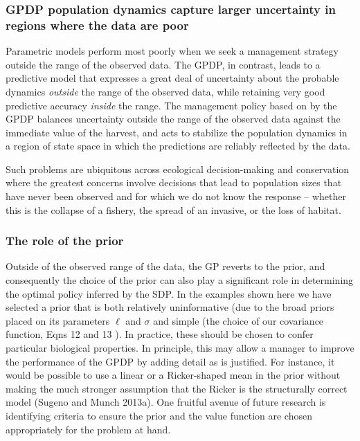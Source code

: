 \documentclass[author-year, 12pt,review]{components/elsarticle} %
\begin{document}
\subsubsection{GPDP population dynamics capture larger uncertainty in
regions where the data are
poor}\label{gpdp-population-dynamics-capture-larger-uncertainty-in-regions-where-the-data-are-poor}

Parametric models perform most poorly when we seek a management strategy
outside the range of the observed data. The GPDP, in contrast, leads to
a predictive model that expresses a great deal of uncertainty about the
probable dynamics \emph{outside} the range of the observed data, while
retaining very good predictive accuracy \emph{inside} the range. The
management policy based on by the GPDP balances uncertainty outside the
range of the observed data against the immediate value of the harvest,
and acts to stabilize the population dynamics in a region of state space
in which the predictions are reliably reflected by the data.

Such problems are ubiquitous across ecological decision-making and
conservation where the greatest concerns involve decisions that lead to
population sizes that have never been observed and for which we do not
know the response -- whether this is the collapse of a fishery, the
spread of an invasive, or the loss of habitat.

\subsubsection{The role of the prior}\label{the-role-of-the-prior}

Outside of the observed range of the data, the GP reverts to the prior,
and consequently the choice of the prior can also play a significant
role in determining the optimal policy inferred by the SDP. In the
examples shown here we have selected a prior that is both relatively
uninformative (due to the broad priors placed on its parameters $\ell$
and $\sigma$ and simple (the choice of our covariance function, Eqns 12
and 13 ). In practice, these should be chosen to confer particular
biological properties. In principle, this may allow a manager to improve
the performance of the GPDP by adding detail as is justified. For
instance, it would be possible to use a linear or a Ricker-shaped mean
in the prior without making the much stronger assumption that the Ricker
is the structurally correct model (Sugeno and Munch 2013a). One fruitful
avenue of future research is identifying criteria to ensure the prior
and the value function are chosen appropriately for the problem at hand.
\end{document}
